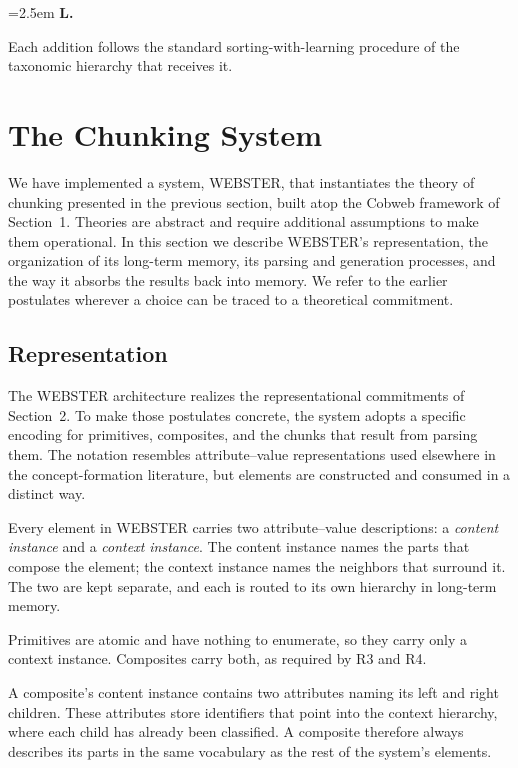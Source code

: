 \documentclass{article}
\newcounter{lpostulate}
\newenvironment{lpost}{%
  \stepcounter{lpostulate}%
  \par\noindent
  \hangindent=2.5em\hangafter=1%
  \textbf{L\thelpostulate.}~\ignorespaces
  \setlength{\parindent}{0pt}%
  \setlength{\parskip}{4pt}%
}{%
  \par\medskip
}
\begin{document}
\begin{lpost}
Each addition follows the standard sorting-with-learning procedure of the taxonomic hierarchy that receives it.
\end{lpost}

\section{The Chunking System}

We have implemented a system, WEBSTER, that instantiates the theory of chunking presented in the previous section, built atop the Cobweb framework of Section~1. Theories are abstract and require additional assumptions to make them operational. In this section we describe WEBSTER's representation, the organization of its long-term memory, its parsing and generation processes, and the way it absorbs the results back into memory. We refer to the earlier postulates wherever a choice can be traced to a theoretical commitment.

\subsection{Representation}

The WEBSTER architecture realizes the representational commitments of Section~2. To make those postulates concrete, the system adopts a specific encoding for primitives, composites, and the chunks that result from parsing them. The notation resembles attribute--value representations used elsewhere in the concept-formation literature, but elements are constructed and consumed in a distinct way.

Every element in WEBSTER carries two attribute--value descriptions: a \emph{content instance} and a \emph{context instance}. The content instance names the parts that compose the element; the context instance names the neighbors that surround it. The two are kept separate, and each is routed to its own hierarchy in long-term memory.

Primitives are atomic and have nothing to enumerate, so they carry only a context instance. Composites carry both, as required by R3 and R4.

A composite's content instance contains two attributes naming its left and right children. These attributes store identifiers that point into the context hierarchy, where each child has already been classified. A composite therefore always describes its parts in the same vocabulary as the rest of the system's elements.
\end{document}
